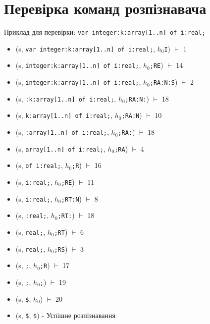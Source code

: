 \newcommand{\xvdash}[1]{$\stackrel{\text{#1}}{\vdash}$}

\newpage
\section{Перевірка команд розпізнавача}
Приклад для перевірки: \verb|var integer:k:array[1..n] of i:real;|
\begin{itemize}
    \item[]  (s, \quad \verb|var integer:k:array[1..n] of i:real;|, \quad $h_{0}$\verb|I|)              $\vdash$ 1
    \item[]  (s, \quad \verb|integer:k:array[1..n] of i:real;|,     \quad $h_{0}$\verb|;RE|)            $\vdash$ 14
    \item[]  (s, \quad \verb|integer:k:array[1..n] of i:real;|,     \quad $h_{0}$\verb|;RA:N:S|)        $\vdash$ 2
    \item[]  (s, \quad \verb|:k:array[1..n] of i:real;|,            \quad $h_{0}$\verb|;RA:N:|)         $\vdash$ 18
    \item[]  (s, \quad \verb|k:array[1..n] of i:real;|,             \quad $h_{0}$\verb|;RA:N|)          $\vdash$ 10
    \item[]  (s, \quad \verb|:array[1..n] of i:real;|,              \quad $h_{0}$\verb|;RA:|)           $\vdash$ 18
    \item[]  (s, \quad \verb|array[1..n] of i:real;|,               \quad $h_{0}$\verb|;RA|)            $\vdash$ 4
    \item[]  (s, \quad \verb|of i:real;|,                           \quad $h_{0}$\verb|;R|)             $\vdash$ 16
    \item[]  (s, \quad \verb|i:real;|,                              \quad $h_{0}$\verb|;RE|)            $\vdash$ 11
    \item[]  (s, \quad \verb|i:real;|,                              \quad $h_{0}$\verb|;RT:N|)          $\vdash$ 8
    \item[]  (s, \quad \verb|:real;|,                               \quad $h_{0}$\verb|;RT:|)           $\vdash$ 18
    \item[]  (s, \quad \verb|real;|,                                \quad $h_{0}$\verb|;RT|)            $\vdash$ 6
    \item[]  (s, \quad \verb|real;|,                                \quad $h_{0}$\verb|;RS|)            $\vdash$ 3
    \item[]  (s, \quad \verb|;|,                                    \quad $h_{0}$\verb|;R|)             $\vdash$ 17
    \item[]  (s, \quad \verb|;|,                                    \quad $h_{0}$\verb|;|)              $\vdash$ 19
    \item[]  (s, \quad \verb|$|,                                    \quad $h_{0}$)                      $\vdash$ 20
    \item[]  (s, \quad \verb|$|,                                    \quad \verb|$|) - Успішне розпізнавання
\end{itemize}
